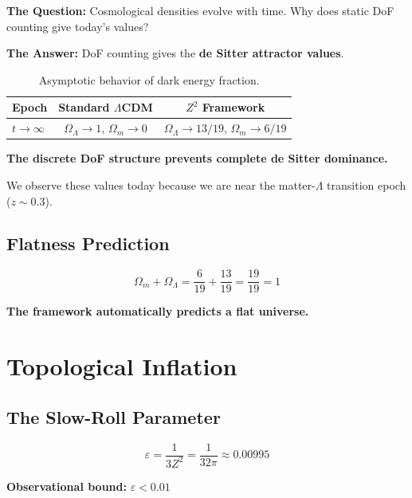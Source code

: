 \documentclass[12pt,a4paper]{article}
\newcommand{\OmegaL}{\Omega_\Lambda}
\newcommand{\OmegaM}{\Omega_m}
\newcommand{\Zsq}{Z^2}
\begin{document}
\textbf{The Question:} Cosmological densities evolve with time. Why does static DoF counting give today's values?

\textbf{The Answer:} DoF counting gives the \textbf{de Sitter attractor values}.

\begin{table}[H]
\centering
\begin{tabular}{lcc}
\toprule
\textbf{Epoch} & \textbf{Standard $\Lambda$CDM} & \textbf{$\Zsq$ Framework} \\
\midrule
$t \to \infty$ & $\OmegaL \to 1$, $\OmegaM \to 0$ & $\OmegaL \to 13/19$, $\OmegaM \to 6/19$ \\
\bottomrule
\end{tabular}
\caption{Asymptotic behavior of dark energy fraction.}
\end{table}

\textbf{The discrete DoF structure prevents complete de Sitter dominance.}

We observe these values today because we are near the matter-$\Lambda$ transition epoch ($z \sim 0.3$).

\subsection{Flatness Prediction}

\begin{equation}
\OmegaM + \OmegaL = \frac{6}{19} + \frac{13}{19} = \frac{19}{19} = 1
\end{equation}

\textbf{The framework automatically predicts a flat universe.}

\section{Topological Inflation}
\label{sec:inflation}

\subsection{The Slow-Roll Parameter}

\begin{equation}
\varepsilon = \frac{1}{3\Zsq} = \frac{1}{32\pi} \approx 0.00995
\end{equation}

\textbf{Observational bound:} $\varepsilon < 0.01$ \checkmark
\end{document}
